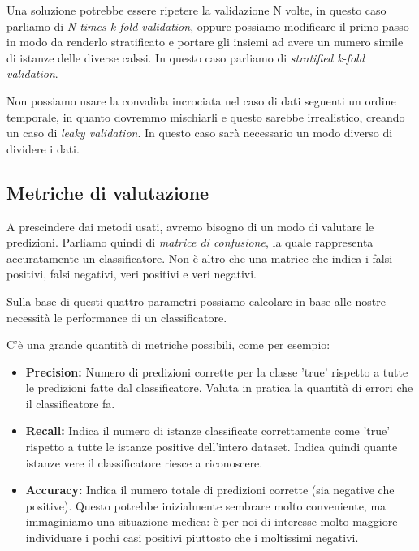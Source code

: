        Una soluzione potrebbe essere ripetere la validazione N volte, in questo caso parliamo di \textit{N-times k-fold validation}, oppure possiamo modificare il primo passo in modo da renderlo stratificato e portare gli insiemi ad avere un numero simile di istanze delle diverse calssi. In questo caso parliamo di \textit{stratified k-fold validation}.
        
        Non possiamo usare la convalida incrociata nel caso di dati seguenti un ordine temporale, in quanto dovremmo mischiarli e questo sarebbe irrealistico, creando un caso di \textit{leaky validation}. In questo caso sarà necessario un modo diverso di dividere i dati.
        
    \subsection{Metriche di valutazione}
        A prescindere dai metodi usati, avremo bisogno di un modo di valutare le predizioni. Parliamo quindi di \textit{matrice di confusione}, la quale rappresenta accuratamente un classificatore. Non è altro che una matrice che indica i falsi positivi, falsi negativi, veri positivi e veri negativi.
        
        Sulla base di questi quattro parametri possiamo calcolare in base alle nostre necessità le performance di un classificatore.
        
        C'è una grande quantità di metriche possibili, come per esempio:
        \begin{itemize}
            \item \textbf{Precision:} Numero di predizioni corrette per la classe 'true' rispetto a tutte le predizioni fatte dal classificatore. Valuta in pratica la quantità di errori che il classificatore fa.
            
            \item \textbf{Recall:} Indica il numero di istanze classificate correttamente come 'true' rispetto a tutte le istanze positive dell'intero dataset. Indica quindi quante istanze vere il classificatore riesce a riconoscere.
            
            \item \textbf{Accuracy:} Indica il numero totale di predizioni corrette (sia negative che positive). Questo potrebbe inizialmente sembrare molto conveniente, ma immaginiamo una situazione medica: è per noi di interesse molto maggiore individuare i pochi casi positivi piuttosto che i moltissimi negativi.
        \end{itemize}
        

